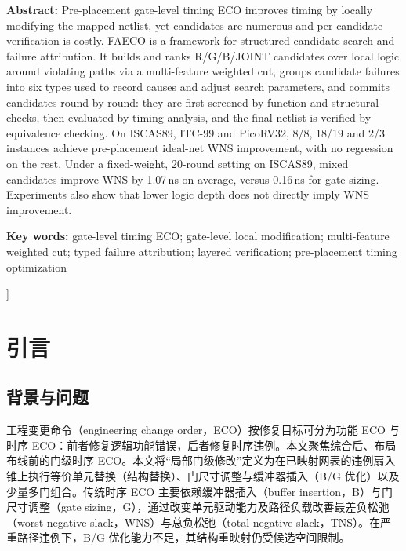 \documentclass[twocolumn,10pt,fontset=windows]{ctexart}
\begin{document}
\begin{flushleft}
  {\bfseries Abstract:} {\small Pre-placement gate-level timing ECO improves timing by locally modifying the mapped netlist, yet candidates are numerous and per-candidate verification is costly. FAECO is a framework for structured candidate search and failure attribution. It builds and ranks R/G/B/JOINT candidates over local logic around violating paths via a multi-feature weighted cut, groups candidate failures into six types used to record causes and adjust search parameters, and commits candidates round by round: they are first screened by function and structural checks, then evaluated by timing analysis, and the final netlist is verified by equivalence checking. On ISCAS89, ITC-99 and PicoRV32, 8/8, 18/19 and 2/3 instances achieve pre-placement ideal-net WNS improvement, with no regression on the rest. Under a fixed-weight, 20-round setting on ISCAS89, mixed candidates improve WNS by 1.07\,ns on average, versus 0.16\,ns for gate sizing. Experiments also show that lower logic depth does not directly imply WNS improvement.}\par
\vspace{3pt}
{\bfseries Key words:} {\small gate-level timing ECO; gate-level local modification; multi-feature weighted cut; typed failure attribution; layered verification; pre-placement timing optimization}\par
\end{flushleft}
]%


\section{引言}

\subsection{背景与问题}
工程变更命令（engineering change order，ECO）按修复目标可分为功能 ECO 与时序 ECO：前者修复逻辑功能错误，后者修复时序违例。本文聚焦综合后、布局布线前的门级时序 ECO。本文将“局部门级修改”定义为在已映射网表的违例扇入锥上执行等价单元替换（结构替换）、门尺寸调整与缓冲器插入（B/G 优化）以及少量多门组合。传统时序 ECO 主要依赖缓冲器插入（buffer insertion，B）与门尺寸调整（gate sizing，G），通过改变单元驱动能力及路径负载改善最差负松弛（worst negative slack，WNS）与总负松弛（total negative slack，TNS）。在严重路径违例下，B/G 优化能力不足，其结构重映射仍受候选空间限制\cite{ho2010eco,liu2021rlsizer,chen2024aito}。
\end{document}

